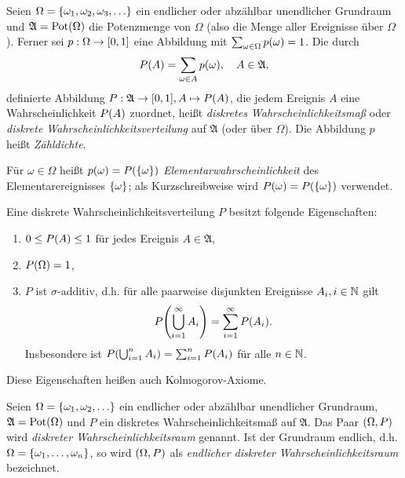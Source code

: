 \documentclass{lecture}
\begin{document}
    \begin{definition}
        Seien \(\Omega = \braces*{\omega_1, \omega_2, \omega_3, \ldots}\) ein endlicher oder abzählbar unendlicher Grundraum und \(\mathfrak{A} = \Pot\parentheses*{\Omega}\) die Potenzmenge von \(\Omega\) (also die Menge aller Ereignisse über \(\Omega\)).
        Ferner sei \(p: \Omega \to \brackets*{0, 1}\) eine Abbildung mit \(\sum_{\omega \in \Omega}p\parentheses*{\omega} = 1\).
        Die durch
        \[
            P\parentheses*{A} = \sum_{\omega \in A}p\parentheses*{\omega}, \quad A \in \mathfrak{A},
        \]
        definierte Abbildung \(P: \mathfrak{A} \to \brackets*{0, 1}, A \mapsto P\parentheses*{A}\), die jedem Ereignis \(A\) eine Wahrscheinlichkeit \(P\parentheses*{A}\) zuordnet, heißt \emph{diskretes Wahrscheinlichkeitsmaß} oder \emph{diskrete Wahrscheinlichkeitsverteilung} auf \(\mathfrak{A}\) (oder über \(\Omega\)).
        Die Abbildung \(p\) heißt \emph{Zähldichte}.

        Für \(\omega \in \Omega\) heißt \(p\parentheses*{\omega} = P\parentheses*{\braces*{\omega}}\) \emph{Elementarwahrscheinlichkeit} des Elementarereignisses \(\braces*{\omega}\); als Kurzschreibweise wird \(P\parentheses*{\omega} = P\parentheses*{\braces*{\omega}}\) verwendet.
    \end{definition}

    \begin{remark}
        Eine diskrete Wahrscheinlichkeitsverteilung \(P\) besitzt folgende Eigenschaften:
        \begin{enumerate}
            \item \(0 \le P\parentheses*{A} \le 1\) für jedes Ereignis \(A \in \mathfrak{A}\),
            \item \(P\parentheses*{\Omega} = 1\),
            \item \(P\) ist \(\sigma\)-additiv, d.h. für alle paarweise disjunkten Ereignisse \(A_i, i \in \N\) gilt
            \[
                P\parentheses*{\bigcup_{i = 1}^\infty A_i} = \sum_{i = 1}^\infty P\parentheses*{A_i}.
            \]
            Insbesondere ist \(P\parentheses*{\bigcup_{i = 1}^n A_i} = \sum_{i = 1}^n P\parentheses*{A_i}\) für alle \(n \in \N\).
        \end{enumerate}
    \end{remark}

    Diese Eigenschaften heißen auch Kolmogorov-Axiome.

    \begin{definition}
        Seien \(\Omega = \braces*{\omega_1, \omega_2, \ldots}\) ein endlicher oder abzählbar unendlicher Grundraum, \(\mathfrak{A} = \Pot\parentheses*{\Omega}\) und \(P\) ein diskretes Wahrscheinlichkeitsmaß auf \(\mathfrak{A}\).
        Das Paar \(\parentheses*{\Omega, P}\) wird \emph{diskreter Wahrscheinlichkeitsraum} genannt.
        Ist der Grundraum endlich, d.h. \(\Omega = \braces*{\omega_1, \ldots, \omega_n}\), so wird \(\parentheses*{\Omega, P}\) als \emph{endlicher diskreter Wahrscheinlichkeitsraum} bezeichnet.
    \end{definition}
\end{document}
